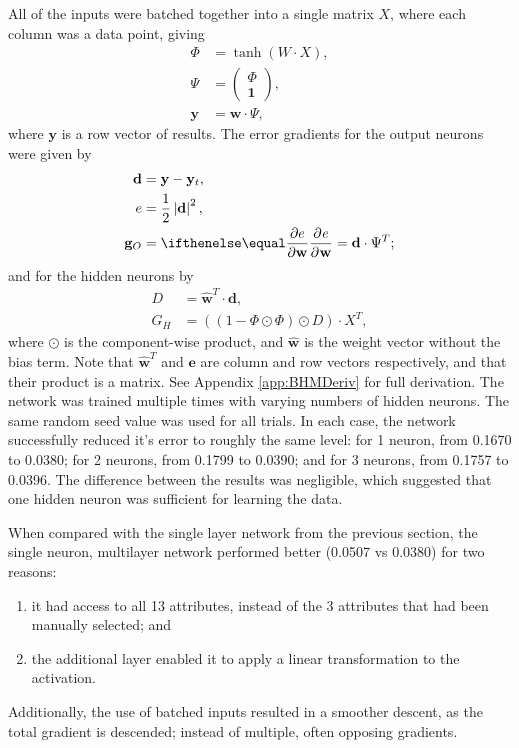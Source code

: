 All of the inputs were batched together into a single matrix $X$, where each
column was a data point, giving
\begin{align*}
    \Phi &= \tanh(W\cdot X),\\
    \Psi &= \begin{pmatrix} \Phi \\ \mathbf{1} \end{pmatrix},\\
    \mathbf{y} &= \mathbf{w}\cdot\Psi,
\end{align*}
where $\mathbf{y}$ is a row vector of results.
The error gradients for the output neurons were given by
\begin{align*}
    \mathbf{d} &= \mathbf{y} - \mathbf{y}_t,\\
    e &= \frac{1}{2}\left|\mathbf{d}\right|^2,\\
    \mathbf{g}_O &= \Rpdiff{e}{\mathbf{w}} = \mathbf{d}\cdot\Psi^T;
\end{align*}
and for the hidden neurons by
\begin{align*}
    D &= \hat{\mathbf{w}}^T\cdot\mathbf{d},\\
    G_H &= ((1 - \Phi\odot\Phi)\odot D) \cdot X^T,
\end{align*}
where $\odot$ is the component-wise product, and $\hat{\mathbf{w}}$ is the
weight vector without the bias term.
Note that $\hat{\mathbf{w}}^T$ and $\mathbf{e}$ are column and row vectors
respectively, and that their product is a matrix.
See Appendix \ref{app:BHMDeriv} for full derivation.
The network was trained multiple times with varying numbers of hidden neurons.
The same random seed value was used for all trials.
In each case, the network successfully reduced it's error to roughly the same
level:
for 1 neuron, from 0.1670 to 0.0380;
for 2 neurons, from 0.1799 to 0.0390; and
for 3 neurons, from 0.1757 to 0.0396.
The difference between the results was negligible, which suggested that one
hidden neuron was sufficient for learning the data.

When compared with the single layer network from the previous section, the
single neuron, multilayer network performed better (0.0507 vs 0.0380) for two
reasons:
\begin{enumerate}
    \item it had access to all 13 attributes, instead of the 3 attributes that
        had been manually selected; and
    \item the additional layer enabled it to apply a linear transformation to
        the activation.
\end{enumerate}
Additionally, the use of batched inputs resulted in a smoother descent, as the
total gradient is descended; instead of multiple, often opposing gradients.



